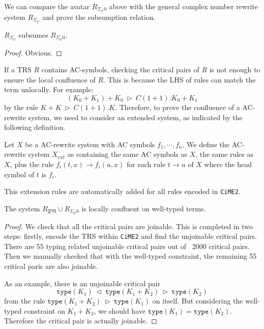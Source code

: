 \documentclass[manuscript, review, timestamp]{acmart}
\newcommand*{\type}{\texttt{type}}
\newcommand*{\reduce}{\ \triangleright\ }
\newcommand*{\reducefrom}{\ \triangleleft\ }
\begin{document}
We can compare the avatar $R_{\Sigma_\mathcal{C}0}$ above with the general complex number rewrite system $R_{\Sigma_\mathcal{C}}$ and prove the subsumption relation.

\begin{proposition}
  $R_{\Sigma_\mathcal{C}}$ subsumes $R_{\Sigma_\mathcal{C}0}$.
\end{proposition}

\begin{proof}
  Obvious.
\end{proof}


If a TRS $R$ contains AC-symbols, checking the critical pairs of $R$ is not enough to ensure the local confluence of $R$. This is because the LHS of rules can match the term unlocally. For example:
$$
(K_0 + K_1) + K_0 \reduce C(1 + 1).K_0 + K_1
$$
by the rule $ K + K \reduce C(1 + 1).K$. Therefore, to prove the confluence of a AC-rewrite system, we need to consider an extended system, as indicated by the following definition.

\begin{definition}
  Let $X$ be a AC-rewrite system with AC symbols $f_1, \cdots, f_n$. We define the AC-rewrite system $X_{ext}$ as containing the same AC symbols as $X$, the same rules as $X$, plus the rule $f_i(t, x) \to f_i(u, x)$ for each rule $t \to u$ of $X$ where the head symbol of $t$ is $f_i$.
\end{definition}

This extension rules are automatically added for all rules encoded in \texttt{CiME2}.

\begin{proposition}
  The system $R_\mathfrak{DN} \cup R_{\Sigma_\mathcal{C}0}$ is locally confluent on well-typed terms.
\end{proposition}
\begin{proof}
  We check that all the critical pairs are joinable. This is completed in two steps: firstly, encode the TRS within \texttt{CiME2} and find the unjoinable critical pairs. There are 55 typing related unjoinable critical pairs out of ~2000 critical pairs. Then we manually checked that with the well-typed constraint, the remaining 55 critical paris are also joinable. 
  
  As an example, there is an unjoinable critical pair
  $$
    \type(K_1) \reducefrom \type(K_1 + K_2) \reduce \type(K_2)
  $$
  from the rule $\type(K_1 + K_2) \reduce \type(K_1)$ on itself. But considering the well-typed constraint on $K_1 + K_2$, we should have $\type(K_1) = \type(K_2)$. Therefore the critical pair is actually joinable.
\end{proof}
\end{document}
